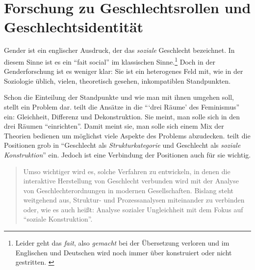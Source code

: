 
\section{Forschung zu Geschlechtsrollen und Geschlechtsidentität}


 Gender ist ein englischer Ausdruck, der das \emph{soziale} Geschlecht bezeichnet. In diesem Sinne ist es ein \hyphenquote{french}{fait social} im klassischen Sinne.\footnote{Leider geht das \emph{fait}, also \emph{gemacht} bei der Übersetzung verloren und im Englischen und Deutschen wird noch immer über konstruiert oder nicht gestritten. \parencite[152--161]{Latour2010}} \parencite[Kap.\,1]{Durkheim1970} Doch in der Genderforschung ist es weniger klar: Sie ist ein heterogenes Feld mit, wie in der Soziologie üblich, vielen, theoretisch gesehen, inkompatiblen Standpunkten. \parencite[67]{Nissen1998} 

Schon die Einteilung der Standpunkte und wie man mit ihnen umgehen soll, stellt ein Problem dar.  teilt die Ansätze in die \enquote{\enquote{drei Räume} des Feminismus} ein: Gleichheit, Differenz und Dekonstruktion. Sie meint, man solle sich in den drei Räumen \enquote{einrichten}. Damit meint sie, man solle sich einem Mix der Theorien bedienen um möglichst viele Aspekte des Problems abzudecken.  teilt die Positionen grob in \enquote{Geschlecht als \emph{Strukturkategorie} und Geschlecht als \emph{soziale Konstruktion}} ein. Jedoch ist eine Verbindung der Positionen auch für sie wichtig.
\blockcquote[223]{Gildemeister2000}{Umso wichtiger wird es, solche Verfahren zu entwickeln, in denen die interaktive Herstellung von Geschlecht verbunden wird mit der Analyse von Geschlechterordnungen in modernen Gesellschaften. Bislang steht weitgehend aus, Struktur- und Prozessanalysen miteinander zu verbinden oder, wie es auch heißt: Analyse sozialer Ungleichheit mit dem Fokus auf \enquote{soziale Konstruktion}.}
	

